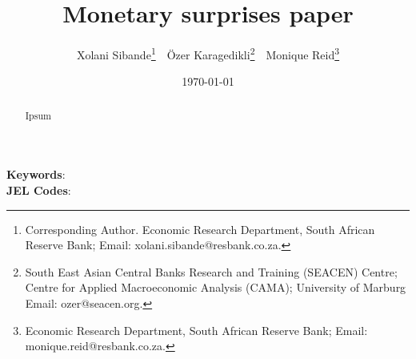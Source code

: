
\title{Monetary surprises paper}


\author { Xolani Sibande\footnote{Corresponding Author.  Economic Research Department, South African Reserve Bank; Email: xolani.sibande@resbank.co.za.} \,\, 
Özer Karagedikli\footnote{South East Asian Central Banks Research and Training (SEACEN) Centre;
Centre for Applied Macroeconomic Analysis (CAMA);
University of Marburg
    Email: ozer@seacen.org.} \,\,
Monique Reid\footnote{Economic Research Department, South African Reserve Bank; Email: monique.reid@resbank.co.za.} 
}
\date{\today}
\maketitle

\begin{abstract}

Ipsum

\end{abstract}

\noindent\textbf{Keywords}: 
\\
\textbf{JEL Codes}: 
\newpage